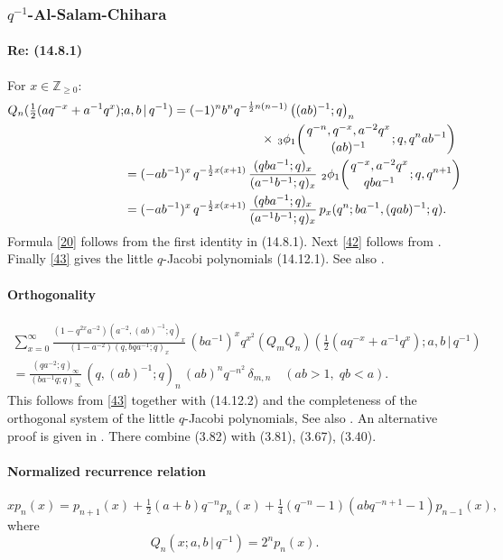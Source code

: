 \documentclass[twoside,11pt]{article}
\newcommand\ZZ{\mathbb{Z}}
\newcommand\de\delta
\newcommand\half{\frac12}
\newcommand\thalf{\tfrac12}
\newcommand\iy\infty
\newcommand\Znonneg{\ZZ_{\ge0}}
\newcommand{\qhyp}[5]{\,\mbox{}_{#1}\phi_{#2}\!\left(
  \genfrac{}{}{0pt}{}{#3}{#4};#5\right)}
\begin{document}
\subsubsection*{$q^{-1}$-Al-Salam-Chihara}
%
\paragraph{Re: (14.8.1)}
For $x\in\Znonneg$:
%
\begin{align}
Q_n(\thalf(aq^{-x}+a^{-1}q^x);&a,b\,|\, q^{-1})=
(-1)^n b^n q^{-\half n(n-1)}\left((ab)^{-1};q\right)_n
\nonumber\\
&\qquad\qquad\qquad\qquad\qquad\quad
\times\qhyp31{q^{-n},q^{-x},a^{-2}q^x}{(ab)^{-1}}{q,q^nab^{-1}}
\label{20}\\
&=(-ab^{-1})^x\,q^{-\half x(x+1)}\,\frac{(qba^{-1};q)_x}{(a^{-1}b^{-1};q)_x}\,
\qhyp21{q^{-x},a^{-2}q^x}{qba^{-1}}{q,q^{n+1}}
\label{42}\\
&=(-ab^{-1})^x\,q^{-\half x(x+1)}\,\frac{(qba^{-1};q)_x}{(a^{-1}b^{-1};q)_x}\,
p_x(q^n;ba^{-1},(qab)^{-1};q).
\label{43}
\end{align}
%
Formula \eqref{20} follows from the first identity in (14.8.1).
Next \eqref{42} follows from .
Finally \eqref{43} gives the little $q$-Jacobi polynomials (14.12.1).
See also .
%
\paragraph{Orthogonality}
%
\begin{multline}
\sum_{x=0}^\iy
\frac{(1-q^{2x}a^{-2}) (a^{-2},(ab)^{-1};q)_x}
{(1-a^{-2}) (q,bqa^{-1};q)_x}\,
(ba^{-1})^xq^{x^2}
(Q_mQ_n)(\thalf(aq^{-x}+a^{-1}q^x);a,b\,|\, q^{-1})\\
=\frac{(qa^{-2};q)_\iy}{(ba^{-1}q;q)_\iy}\,
(q,(ab)^{-1};q)_n\,(ab)^nq^{-n^2}\,\de_{m,n}
\quad(ab>1,\;qb<a).
\label{21}
\end{multline}
%
This follows from \eqref{43} together with (14.12.2) and the completeness of
the orthogonal system of the little $q$-Jacobi polynomials,
See also . An alternative proof is given in
. There combine (3.82) with (3.81), (3.67), (3.40).
%
\paragraph{Normalized recurrence relation}
%
\begin{equation}
xp_n(x)=p_{n+1}(x)+\thalf(a+b)q^{-n} p_n(x)+
\tfrac14(q^{-n}-1)(abq^{-n+1}-1)p_{n-1}(x),
\label{22}
\end{equation}
%
where
\[
Q_n(x;a,b\,|\, q^{-1})=2^n p_n(x).
\]
%
\end{document}
